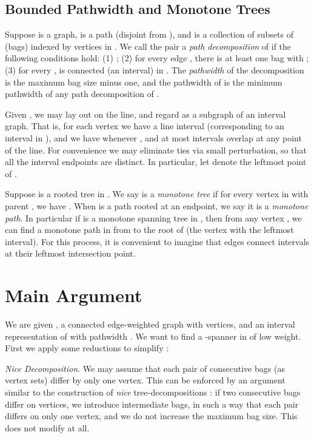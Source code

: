 \documentclass{llncs}
\begin{document}
\subsection{Bounded Pathwidth and Monotone Trees}
\label{def:bpmt}
Suppose  is a graph,  is a path (disjoint from ), and
 is a collection of subsets of  (bags) indexed
by vertices  in .  We call the pair  a
\emph{path decomposition} of  if the following conditions hold: (1)
; (2) for every edge , there
is at least one bag  with ; (3) for
every ,  is connected
(an interval) in .  The \emph{pathwidth} of the decomposition is
the maximum bag size minus one, and the pathwidth of  is the
minimum pathwidth of any path decomposition of .

Given , we may lay out  on the line, and regard
 as a subgraph of an interval graph.  That is, for each vertex 
we have a line interval  (corresponding to an interval in ),
and we have  whenever ,
and at most  intervals overlap at any point of the line.  For
convenience we may eliminate ties via small perturbation, so that all the interval endpoints
are distinct.  In particular, let  denote the leftmost point
of .   



Suppose  is a rooted tree in .  We say  is a \emph{monotone tree} if
for every vertex  in  with parent , we have .  When  is a path rooted at an endpoint, we say it is a
\emph{monotone path}.  In particular if  is a monotone spanning
tree in , then from any vertex , we can find a monotone path in
 from  to the root of  (the vertex with the leftmost
interval).  For this process, it is convenient to imagine that edges
connect intervals at their leftmost intersection point.

\section{Main Argument}
\label{sec:mainarg}

We are given , a connected edge-weighted graph  with
 vertices, and an interval representation  of  with
pathwidth .  We want to find a -spanner  in 
of low weight.  First we apply some reductions to simplify :


\emph{Nice Decomposition}. We may assume that each pair of consecutive bags (as vertex
sets) differ by only one vertex.  This can be enforced by an argument
similar to the construction of \emph{nice} tree-decompositions
\cite{DBLP:books/sp/Kloks94}: if two consecutive bags differ on  vertices, we introduce  intermediate bags, in such a way that
each pair differs on only one vertex, and we do not increase the
maximum bag size. This does not modify  at all.
\end{document}

